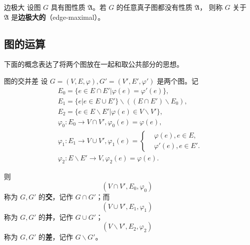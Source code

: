 \begin{definition}{边极大}
设图 $G$ 具有图性质 $\mathfrak A$。若 $G$ 的任意真子图都没有性质 $\mathfrak A$， 则称 $G$ 关于  $\mathfrak A$ 是\textbf{边极大的}（edge-maximal）。
\end{definition}

\subsection{图的运算}
下面的概念表达了将两个图放在一起和取公共部分的思想。

\begin{definition}{图的交并差}
设 $G=(V,E,\varphi),G'=(V',E',\varphi')$ 是两个图。记
\begin{equation}
\begin{aligned}
&E_0=\{e\in E\cap E'|\varphi(e)=\varphi'(e)\},\\
&E_1=\{e|e\in E\cup E'\}\backslash ((E\cap E')\backslash E_0),\\
&E_2=\{e\in E\backslash E'|\varphi(e)\in V\backslash V'\},\\
&\varphi_0:E_0\rightarrow V\cap V',\varphi_0(e)=\varphi(e),\\
&\varphi_1:E_1\rightarrow V\cup V',\varphi_1(e)=\left\{\begin{aligned}
&\varphi(e),e\in E,\\
&\varphi'(e),e\in E'.
\end{aligned}\right. \\
&\varphi_2:E\backslash E'\rightarrow V,\varphi_2(e)=\varphi(e).
\end{aligned}
~
\end{equation}

则
\begin{equation}
(V\cap V',E_0,\varphi_0)~
\end{equation}
称为 $G,G'$ 的\textbf{交}，记作 $G\cap G'$；而
\begin{equation}
(V\cup V',E_1,\varphi_1)~
\end{equation}
称为 $G,G'$ 的\textbf{并}，记作 $G\cup G'$；
\begin{equation}
(V\backslash V',E_2,\varphi_2)~
\end{equation}
称为 $G,G'$ 的\textbf{差}，记作 $G\backslash G'$。
\end{definition}


